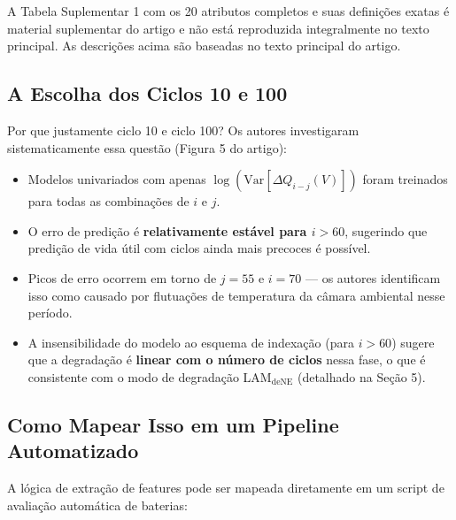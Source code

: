 \documentclass[12pt,a4paper]{article}
\begin{document}
\begin{atencao}
A Tabela Suplementar 1 com os 20 atributos completos e suas defini\c{c}\~oes
exatas \'{e} material suplementar do artigo e n\~ao est\'{a} reproduzida integralmente
no texto principal. As descri\c{c}\~oes acima s\~ao baseadas no texto principal do artigo.
\end{atencao}

\subsection{A Escolha dos Ciclos 10 e 100}

Por que justamente ciclo 10 e ciclo 100? Os autores investigaram sistematicamente
essa quest\~ao (Figura 5 do artigo):

\begin{itemize}
  \item Modelos univariados com apenas $\log(\text{Var}[\Delta Q_{i-j}(V)])$
    foram treinados para todas as combina\c{c}\~oes de $i$ e $j$.
  \item O erro de predi\c{c}\~ao \'{e} \textbf{relativamente est\'{a}vel para $i > 60$},
    sugerindo que predi\c{c}\~ao de vida \'{u}til com ciclos ainda mais precoces
    \'{e} poss\'{i}vel.
  \item Picos de erro ocorrem em torno de $j = 55$ e $i = 70$ --- os autores
    identificam isso como causado por flutua\c{c}\~oes de temperatura da c\^{a}mara
    ambiental nesse per\'{i}odo.
  \item A insensibilidade do modelo ao esquema de indexa\c{c}\~ao (para $i > 60$)
    sugere que a degrada\c{c}\~ao \'{e} \textbf{linear com o n\'{u}mero de ciclos} nessa
    fase, o que \'{e} consistente com o modo de degrada\c{c}\~ao LAM$_\text{deNE}$
    (detalhado na Se\c{c}\~ao 5).
\end{itemize}

\subsection{Como Mapear Isso em um Pipeline Automatizado}

A l\'{o}gica de extra\c{c}\~ao de features pode ser mapeada diretamente em um script
de avalia\c{c}\~ao autom\'{a}tica de baterias:
\end{document}
